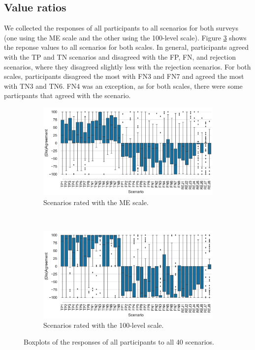 \subsection{Value ratios}
\label{sec:results-value-ratios}
We collected the responses of all participants to all scenarios for both surveys (one using the ME scale and the other using the 100-level scale).
%
Figure \ref{fig:boxplots} shows the reponse values to all scenarios for both scales.
%
In general, participants agreed with the TP and TN scenarios and disagreed with the FP, FN, and rejection scenarios, where they disagreed slightly less with the rejection scenarios.
%
For both scales, participants disagreed the most with FN3 and FN7 and agreed the most with TN3 and TN6.
%
FN4 was an exception, as for both scales, there were some particpants that agreed with the scenario.
\begin{figure}
    \centering
    \begin{subfigure}[b]{\textwidth}
        \centering
        \includegraphics[width=\linewidth]{Figures/boxplots-ME.pdf}
        \caption{Scenarios rated with the ME scale.}
        \label{fig:boxplots-me}
    \end{subfigure}
    \\
    \begin{subfigure}[b]{\textwidth}
        \centering
        \includegraphics[width=\linewidth]{Figures/boxplots-100-level.pdf}
        \caption{Scenarios rated with the 100-level scale.}
        \label{fig:boxplots-100-level}
    \end{subfigure}
    \caption{Boxplots of the responses of all participants to all 40 scenarios.}
    \label{fig:boxplots}
\end{figure}
%


